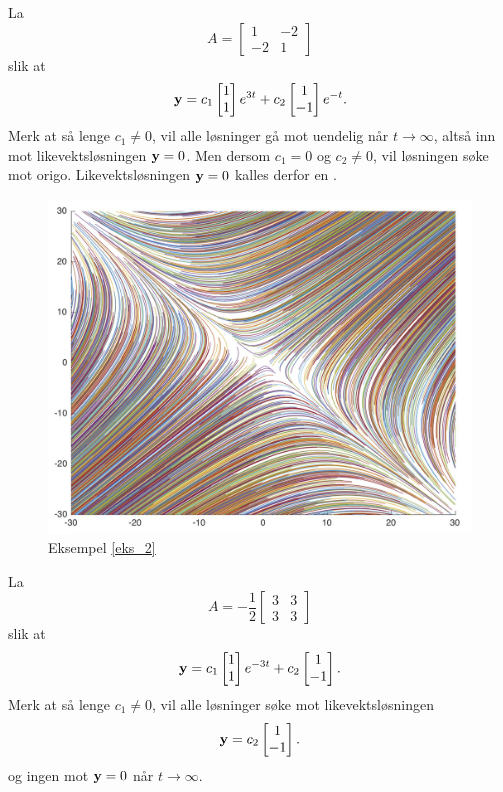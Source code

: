 \begin{ex}
\label{eks_2}
La 
\[
A=
\begin{bmatrix}
1 & -2   \\
-2 & 1
\end{bmatrix}
\]
slik at 
\[
\mathbf{y}=
c_1
\begin{bmatrix}
1  \\
1 
\end{bmatrix} e^{3t}
+
c_2
\begin{bmatrix}
1  \\
-1 
\end{bmatrix}e^{-t}. 
\]
Merk at så lenge $c_1 \neq 0$, 
vil alle løsninger gå mot uendelig når $t\to \infty$, altså inn mot likevektsløsningen $\mathbf{y}=0$. 
Men dersom $c_1=0$ og $c_2\neq0$, vil løsningen søke mot origo. Likevektsløsningen $\mathbf{y}=0$ kalles derfor en
.
\end{ex}


\begin{figure}[htbp]
  \begin{center}
	\includegraphics[scale=.1]{eks_2.jpg}	
	\captionsetup{labelformat=empty}
	\caption{Eksempel \ref{eks_2}}
	\end{center}
\end{figure}



\begin{ex}
\label{eks_hm}
La 
\[
A=-\frac{1}{2}
\begin{bmatrix}
3 & 3   \\
3 & 3
\end{bmatrix}
\]
slik at 
\[
\mathbf{y}=
c_1
\begin{bmatrix}
1  \\
1 
\end{bmatrix} e^{-3t}
+
c_2
\begin{bmatrix}
1  \\
-1 
\end{bmatrix}. 
\]
Merk at så lenge $c_1 \neq 0$, 
vil alle løsninger søke mot likevektsløsningen
\[
\mathbf{y}=
c_2
\begin{bmatrix}
1  \\
-1 
\end{bmatrix}. 
\]
og ingen mot $\mathbf{y}=0$ når $t\to \infty$.
\end{ex}

